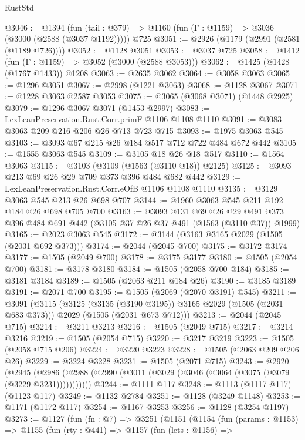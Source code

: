 \begin{lexlean}{RustStd}
\begin{coremodule}
@3046 := @1394
    (fun (tail : @379) => @1160 (fun (Γ : @1159) => @3036 (@3000 (@2588 (@3037 @1192)))))
    @725
@3051 := @2926 (@1179 (@2991 (@2581 (@1189 @726))))
@3052 := @1128 @3051
@3053 := @3037 @725
@3058 := @1412 (fun (Γ : @1159) => @3052 (@3000 (@2588 @3053)))
@3062 := @1425 (@1428 (@1767 @1433)) @1208
@3063 := @2635 @3062
@3064 := @3058 @3063
@3065 := @1296 @3051
@3067 := @2998 (@1221 @3063)
@3068 := @1128 @3067
@3071 := @1228 @3063 @2587 @3053
@3075 := @3065 (@3068 @3071) (@1448 @2925)
@3079 := @1296 @3067 @3071 (@1453 @2997)
@3083 := LexLeanPreservation.Rust.Corr.primF @1106 @1108 @1110
@3091 := @3083 @3063 @209 @216 @206 @26 @713 @723 @715
@3093 := @1975 @3063 @545
@3103 := @3093 @67 @215 @26 @184 @517 @712 @722 @484 @672 @442
@3105 := @1555 @3063 @545
@3109 := @3105 @18 @26 @18 @517
@3110 := @1564 @3063
@3115 := @3103 (@3109 (@1563 (@3110 @18)) @2125)
@3125 := @3093 @213 @69 @26 @29 @709 @373 @396 @484 @682 @442
@3129 := LexLeanPreservation.Rust.Corr.eOfB @1106 @1108 @1110
@3135 := @3129 @3063 @545 @213 @26 @698 @707
@3144 := @1960 @3063 @545 @211 @192 @184 @26 @698 @705 @700
@3163 := @3093
    @131
    @69
    @26
    @29
    @491
    @373
    @396
    @484
    @691
    @442
    (@3105 @37 @26 @37 @491 (@1563 (@3110 @37)) @1999)
@3165 := @2023 @3063 @545
@3172 := @3144 (@3163 @3165 @2029 (@1505 (@2031 @692 @373)))
@3174 := @2044 (@2045 @700)
@3175 := @3172 @3174
@3177 := @1505 (@2049 @700)
@3178 := @3175 @3177
@3180 := @1505 (@2054 @700)
@3181 := @3178 @3180
@3184 := @1505 (@2058 @700 @184)
@3185 := @3181 @3184
@3189 := @1505 (@2063 @211 @184 @26)
@3190 := @3185 @3189
@3191 := @2071 @700
@3195 := @1505 (@2069 (@2070 @3191) @545)
@3211 := @3091
    (@3115
      (@3125 (@3135 (@3190 @3195)) @3165 @2029 (@1505 (@2031 @683 @373)))
      @2029
      (@1505 (@2031 @673 @712)))
@3213 := @2044 (@2045 @715)
@3214 := @3211 @3213
@3216 := @1505 (@2049 @715)
@3217 := @3214 @3216
@3219 := @1505 (@2054 @715)
@3220 := @3217 @3219
@3223 := @1505 (@2058 @715 @206)
@3224 := @3220 @3223
@3228 := @1505 (@2063 @209 @206 @26)
@3229 := @3224 @3228
@3231 := @1505 (@2071 @715)
@3243 := @2920
    (@2945 (@2986 (@2988 (@2990 (@3011 (@3029 (@3046 (@3064 (@3075 (@3079 (@3229 @3231)))))))))))
@3244 := @1111 @117
@3248 := @1113 (@1117 @117) (@1123 @117)
@3249 := @1132 @2784
@3251 := @1128 (@3249 @1148)
@3253 := @1171 (@1172 @117)
@3254 := @1167 @3253
@3256 := @1128 (@3254 @1197)
@3273 := @1127
    (fun (fn : @7) =>
    @3251
      (@1151
        (@1154
          (fun (params : @1153) =>
          @1155
            (fun (rty : @441) =>
            @1157
              (fun (lets : @1156) =>

\end{coremodule}
\end{lexlean}
